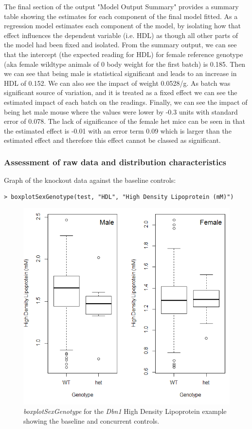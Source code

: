 \documentclass[12pt,a4paper]{article}
\begin{document}
The final section of the output "Model Output Summary" provides a summary table showing the estimates for each component of the final model fitted. As a regression model estimates each component of the model, by isolating how that effect influences the dependent variable (i.e. HDL) as though all other parts of the model had been fixed and isolated. From the summary output, we can see that the intercept (the expected reading for HDL) for female reference genotype (aka female wildtype animals of 0 body weight for the first batch) is 0.185. Then we can see that being male is statistical significant and leads to an increase in HDL of 0.152.  We can also see the impact of weight 0.0528\//g.  As batch was significant source of variation, and it is treated as a fixed effect we can see the estimated impact of each batch on the readings.  Finally, we can see the impact of being het male mouse where the values were lower by -0.3 units with standard error of 0.078.  The lack of significance of the female het mice can be seen in that the estimated effect is -0.01 with an error term 0.09 which is larger than the estimated effect and therefore this effect cannot be classed as significant.

\subsubsection{Assessment of raw data and distribution characteristics}
Graph of the knockout data against the baseline controls:

\begingroup
\fontsize{8pt}{12pt}\selectfont
\begin{verbatim}
> boxplotSexGenotype(test, "HDL", "High Density Lipoprotein (mM)")
\end{verbatim}
\endgroup 

\begin{figure}[H]%
\centerline{\includegraphics[scale=0.5]{cs_tf_1.jpg}}
\caption{\textit{boxplotSexGenotype} for the \textit{Dbn1} High Density Lipoprotein example showing the baseline and concurrent controls.}\label{fig:cs_tf1}
\end{figure}
\end{document}
